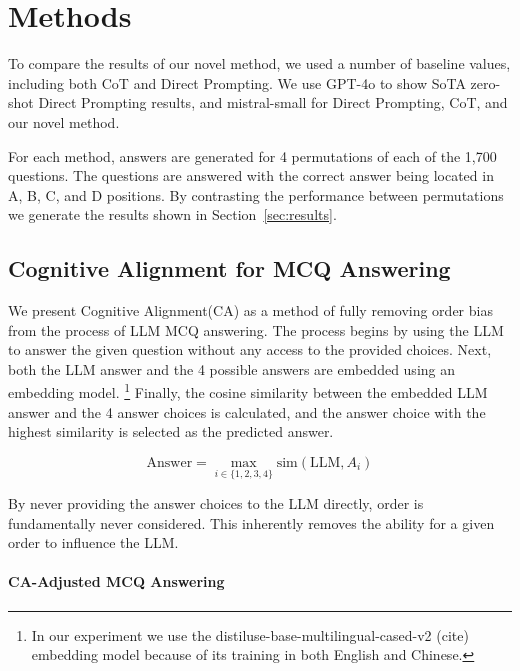 \section{Methods}
\label{sec:method}

To compare the results of our novel method, we used a number of baseline values, including both CoT and Direct Prompting. We use GPT-4o \citep{OpenAI2024-em} to show SoTA zero-shot Direct Prompting results, and mistral-small \citep{mistral_small_24b_2025} for Direct Prompting, CoT, and our novel method.

For each method, answers are generated for 4 permutations of each of the 1,700 questions. The questions are answered with the correct answer being located in A, B, C, and D positions. By contrasting the performance between permutations we generate the results shown in Section~\ref{sec:results}.

\subsection{Cognitive Alignment for MCQ Answering}

We present Cognitive Alignment(CA) as a method of fully removing order bias from the process of LLM MCQ answering. The process begins by using the LLM to answer the given question without any access to the provided choices. Next, both the LLM answer and the 4 possible answers are embedded using an embedding model. \footnote{In our experiment we use the distiluse-base-multilingual-cased-v2 (cite) embedding model because of its training in both English and Chinese.} Finally, the cosine similarity between the embedded LLM answer and the 4 answer choices is calculated, and the answer choice with the highest similarity is selected as the predicted answer.

\begin{equation}
\text{Answer} = \max_{i \in \{1, 2, 3, 4\}} \text{sim}(\text{LLM}, A_i)
\end{equation}


By never providing the answer choices to the LLM directly, order is fundamentally never considered. This inherently removes the ability for a given order to influence the LLM.

\paragraph{CA-Adjusted MCQ Answering}

